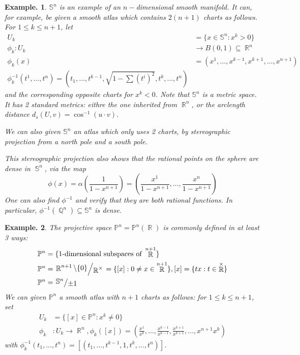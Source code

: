 \documentclass[11pt, a4paper]{memoir}
\DeclareMathOperator{\Q}{{\mathbb{Q}}}
\DeclareMathOperator{\R}{{\mathbb{R}}}
\theoremstyle{change}
\theoremstyle{plain}
\theoremstyle{nonumberplain}
\newtheorem{example}{Example.}
\newcommand{\quot}[2]{\mathchoice{\left.\raisebox{0.14em}{$#1$}\middle/\raisebox{-0.14em}{$#2$}\right.}
                                 {\left.\raisebox{0.08em}{$#1$}\middle/\raisebox{-0.08em}{$#2$}\right.}
                                 {\left.\raisebox{0.03em}{$#1$}\middle/\raisebox{-0.03em}{$#2$}\right.}
                                 {\left.\raisebox{0em}{$#1$}\middle/\raisebox{0em}{$#2$}\right.}}
\DeclareMathOperator{\Ss}{{\mathbb{S}}}
\numberwithin{equation}{section}
\begin{document}
\begin{example}
    $\mathbb{S}^n$ is an example of an $n-$dimensional smooth manifold.
    It can, for example, be given a smooth atlas which contains $2(n+1)$ charts as follows.
    For $1\leq k\leq n+1$, let
    \begin{align*}
        U_k&=\{x\in\mathbb{S}^n:x^k>0\}\\
        \phi_k:U_k&\to B(0,1)\subseteq\R^{n}\\
        \phi_k(x)&=(x^1,\ldots,x^{k-1},x^{k+1},\ldots,x^{n+1})\\
        \phi_k^{-1}(t^1,\ldots,t^n)=\left(t_1,\ldots,t^{k-1},\sqrt{1-\sum(t^i)^2},t^k,\ldots,t^n\right)
    \end{align*}
    and the corresponding opposite charts for $x^k<0$.
    Note that $\mathbb{S}^n$ is a metric space.
    It has 2 standard metrics: eithre the one inherited from $\R^n$, or the arclength distance $d_s(U,v)=\cos^{-1}(u\cdot v)$.

    We can also given $\mathbb{S}^n$ an atlas which only uses 2 charts, by stereographic projection from a north pole and a south pole.

    This stereographic projection also shows that the rational points on the sphere are dense in $\Ss^n$, via the map
    \begin{equation*}
        \phi(x)=\alpha\left(\frac{1}{1-x^{n+1}}\right) = \left(\frac{x^1}{1-x^{n+1}},\ldots,\frac{x^n}{1-x^{n+1}}\right)
    \end{equation*}
    One can also find $\phi^{-1}$ and verify that they are both rational functions.
    In particular, $\phi^{-1}(\Q^n)\subseteq\mathbb{S}^n$ is dense.
\end{example}
\begin{example}
    The projective space $\mathbb{P}^n=\mathbb{P}^n(\R)$ is commonly defined in at least 3 ways:
    \begin{align*}
        \mathbb{P}^n&=\{1\text{-dimensional subspaces of }\R^{n+1}\}\\
        \mathbb{P}^n&=\quot{\R^{n+1}\setminus\{0\}}{\R^\times}=\{[x]:0\neq x\in\R^{n+1}\}, [x]=\{tx:t\in\R^\times\}\\
        \mathbb{P}^n&=\quot{\mathbb{S}^n}{\pm 1}
    \end{align*}
    We can given $\mathbb{P}^n$ a smooth atlas with $n+1$ charts as follows: for $1\leq k\leq n+1$, set
    \begin{align*}
        U_k &= \{[x]\in\mathbb{P}^n:x^k\neq 0\}\\
        \phi_k &:U_k\to\R^n,\phi_k([x])=\left(\frac{x^1}{x^k},\ldots,\frac{x^{k-1}}{x^{k-1}},\frac{x^{k+1}}{x^{k+1}},\ldots,x^{n+1}{x^k}\right)
    \end{align*}
    with $\phi_k^{-1}(t_1,\ldots,t^n)=[(t_1,\ldots,t^{k-1},1,t^k,\ldots,t^n)]$.
\end{example}
\end{document}
